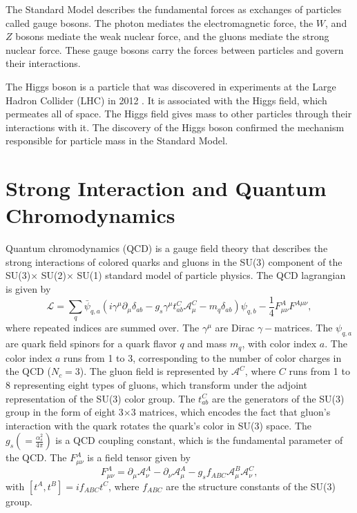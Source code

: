 The Standard Model describes the fundamental forces as exchanges of particles called gauge bosons. The photon mediates the electromagnetic force, the $W$, and $Z$ bosons mediate the weak nuclear force, and the gluons mediate the strong nuclear force. These gauge bosons carry the forces between particles and govern their interactions.

The Higgs boson is a particle that was discovered in experiments at the Large Hadron Collider (LHC) in 2012 \cite{ATLAShiggs:2012, CMShiggs:2012}. It is associated with the Higgs field, which permeates all of space. The Higgs field gives mass to other particles through their interactions with it. The discovery of the Higgs boson confirmed the mechanism responsible for particle mass in the Standard Model.

\section{Strong Interaction and Quantum Chromodynamics}
Quantum chromodynamics (QCD) is a gauge field theory that describes the strong interactions of colored quarks and gluons in the SU(3) component of the SU(3)$\times$ SU(2)$\times$ SU(1) standard model of particle physics. The QCD lagrangian is given by \cite{Workman:2022}
    \begin{equation}
        \mathcal{L} = \sum_q \bar{\psi}_{q,a}(i\gamma^\mu \partial_\mu \delta_{ab} - g_s \gamma^\mu t^C_{ab} \mathcal{A}^C_\mu - m_q \delta_{ab})\psi_{q,b}-\frac{1}{4}F^A_{\mu\nu}F^{A \mu \nu},
    \end{equation}
where repeated indices are summed over. The $\gamma^\mu$ are Dirac $\gamma-$matrices. The $\psi_{q,a}$ are quark field spinors for a quark flavor $ q$ and mass $m_q$, with color index $a$. The color index $a$ runs from 1 to 3, corresponding to the number of color charges in the QCD ($N_c = 3$). The gluon field is represented by $\mathcal{A}^C$, where $C$ runs from 1 to 8 representing eight types of gluons, which transform under the adjoint representation of the SU(3) color group. The $t_{ab}^C$ are the generators of the SU(3) group in the form of eight 3$\times$3 matrices, which encodes the fact that gluon's interaction with the quark rotates the quark's color in SU(3) space. The $g_s(= \frac{\alpha_s^2}{4\pi})$ is a QCD coupling constant, which is the fundamental parameter of the QCD. The $F_{\mu\nu}^A$ is a field tensor given by 
   \begin{equation}
       F_{\mu\nu}^A = \partial_\mu \mathcal{A}^A_\nu - \partial_\nu \mathcal{A}_\mu^A - g_s f_{ABC}\mathcal{A}_\mu^B\mathcal{A}_\nu^C, 
       \end{equation}
with $[t^A,t^B]= if_{ABC}t^C$, where $f_{ABC}$ are the structure constants of the SU(3) group. 

